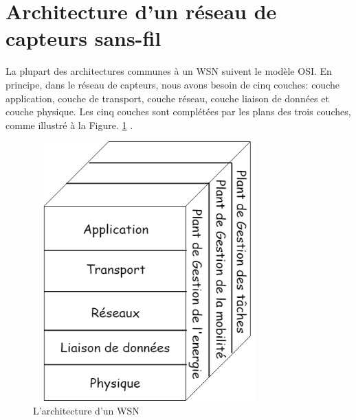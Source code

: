 \section{Architecture d’un réseau de capteurs sans-fil}
La plupart des architectures communes à un WSN suivent le modèle OSI. En principe, dans le réseau de capteurs, nous avons besoin de cinq couches: couche application, couche de transport, couche réseau, couche liaison de données et couche physique. Les cinq couches sont complétées par les plans des trois couches, comme illustré à la Figure. \ref{fig:AWSN} .\\
\begin{figure}[H]
	\centering
	\includegraphics[width=9cm,height=10cm]{Chap1/5.png}
	\caption{L’architecture d’un WSN}
	\label{fig:AWSN}
\end{figure}


